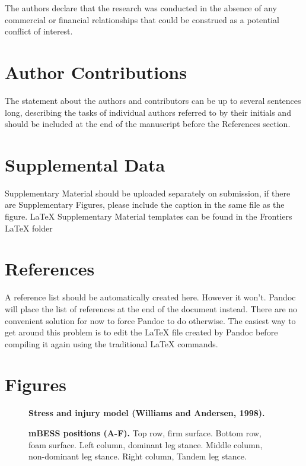 \documentclass[
]{frontiersHLTH}
\begin{document}
The authors declare that the research was conducted in the absence of
any commercial or financial relationships that could be construed as a
potential conflict of interest.

\hypertarget{author-contributions}{%
\section{Author Contributions}\label{author-contributions}}

The statement about the authors and contributors can be up to several
sentences long, describing the tasks of individual authors referred to
by their initials and should be included at the end of the manuscript
before the References section.

\hypertarget{supplemental-data}{%
\section{Supplemental Data}\label{supplemental-data}}

Supplementary Material should be uploaded separately on submission, if
there are Supplementary Figures, please include the caption in the same
file as the figure. LaTeX Supplementary Material templates can be found
in the Frontiers LaTeX folder

\hypertarget{references}{%
\section{References}\label{references}}

A reference list should be automatically created here. However it won't.
Pandoc will place the list of references at the end of the document
instead. There are no convenient solution for now to force Pandoc to do
otherwise. The easiest way to get around this problem is to edit the
LaTeX file created by Pandoc before compiling it again using the
traditional LaTeX commands.

\hypertarget{figures}{%
\section{Figures}\label{figures}}

\begin{figure}[!h]
\caption{{\bf Stress and injury model (Williams and Andersen, 1998).}}
\label{fig:fig1}
\end{figure}

\begin{figure}[!h]
\caption{{\bf mBESS positions (A-F).}
Top row, firm surface. Bottom row, foam surface. Left column, dominant leg stance. Middle column, non-dominant leg stance. Right column, Tandem leg stance.}
\label{fig:fig2}
\end{figure}
\end{document}
